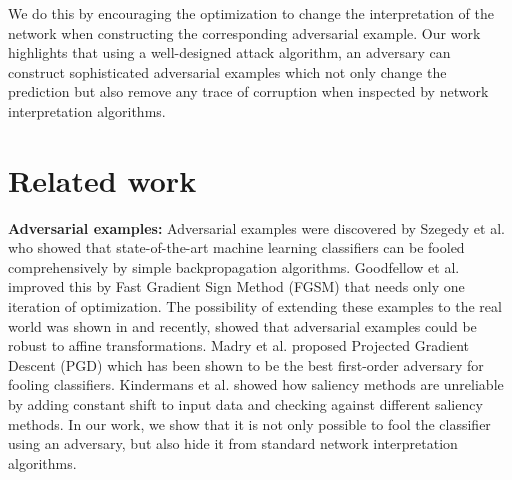 \documentclass[10pt,twocolumn,letterpaper]{article}
\begin{document}
We do this by encouraging the optimization to change the interpretation of the network when constructing the corresponding adversarial example. Our work highlights that using a well-designed attack algorithm, an adversary can construct sophisticated adversarial examples which not only change the prediction but also remove any trace of corruption when inspected by network interpretation algorithms.



\section{Related work}{\bf Adversarial examples:}
Adversarial examples were discovered by Szegedy et al. \cite{intriguing-arxiv-2013} who showed that state-of-the-art machine learning classifiers can be fooled comprehensively by simple backpropagation algorithms. Goodfellow et al. \cite{explainingharnessing-arxiv-2014} improved this by Fast Gradient Sign Method (FGSM) that needs only one iteration of optimization. The possibility of extending these examples to the real world was shown in \cite{world-arxiv-2016,sharif2016accessorize} and recently, \cite{athalye2017synthesizing} showed that adversarial examples could be robust to affine transformations. Madry et al. \cite{madry2017towards} proposed Projected Gradient Descent (PGD) which has been shown to be the best first-order adversary for fooling classifiers.
Kindermans et al. \cite{kindermans2017reliability} showed how saliency methods are unreliable by adding constant shift to input data and checking against different saliency methods. In our work, we show that it is not only possible to fool the classifier using an adversary, but also hide it from standard network interpretation algorithms.
\end{document}
